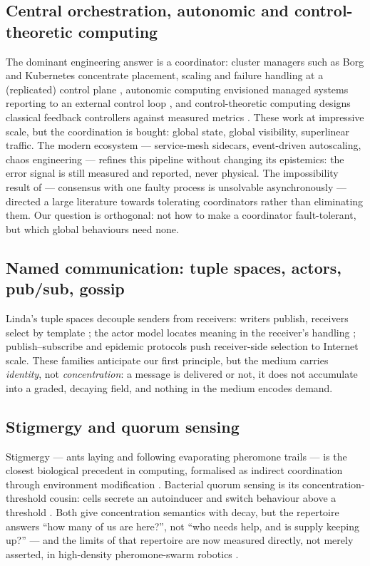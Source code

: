 \documentclass[twoside,twocolumn,usenatbib]{mnras}
\begin{document}
\subsection{Central orchestration, autonomic and control-theoretic
computing}

The dominant engineering answer is a coordinator: cluster managers such
as Borg and Kubernetes concentrate placement, scaling and failure
handling at a (replicated) control plane \citep{burns2016}, autonomic
computing envisioned managed systems reporting to an external control
loop \citep{kephart2003}, and control-theoretic computing designs
classical feedback controllers against measured metrics
\citep{hellerstein2004}. These work at
impressive scale, but the coordination is bought: global state, global
visibility, superlinear traffic. The modern ecosystem --- service-mesh
sidecars, event-driven autoscaling, chaos engineering --- refines this
pipeline without changing its epistemics: the error signal is still
measured and reported, never physical. The impossibility result of
\citet{fischer1985} --- consensus with one faulty process is unsolvable
asynchronously --- directed a large literature towards tolerating
coordinators rather than eliminating them. Our question is orthogonal: not how to make a coordinator
fault-tolerant, but which global behaviours need none.

\subsection{Named communication: tuple spaces, actors, pub/sub, gossip}

Linda's tuple spaces decouple senders from receivers: writers publish,
receivers select by template \citep{carriero1989}; the actor model
locates meaning in the receiver's handling \citep{agha1986};
publish--subscribe and epidemic protocols \citep{demers1987} push
receiver-side selection to Internet scale. These families anticipate our first principle, but the medium
carries \emph{identity}, not \emph{concentration}: a message is
delivered or not, it does not accumulate into a graded, decaying field,
and nothing in the medium encodes demand.

\subsection{Stigmergy and quorum sensing}

Stigmergy --- ants laying and following evaporating pheromone trails ---
is the closest biological precedent in computing, formalised as indirect
coordination through environment modification \citep{parunak1997,
dorigo1996}. Bacterial quorum sensing is its concentration-threshold
cousin: cells secrete an autoinducer and switch behaviour above a
threshold \citep{miller2001}. Both give concentration
semantics with decay, but the repertoire answers ``how many of us are
here?'', not ``who needs help, and is supply keeping up?'' --- and the
limits of that repertoire are now measured directly, not merely
asserted, in high-density pheromone-swarm robotics \citep{hunt2019}.
\end{document}
